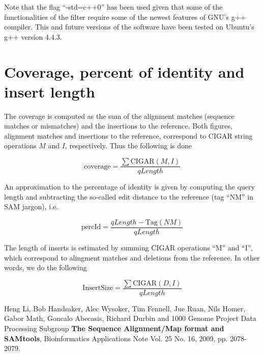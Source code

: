 \documentclass[11pt]{article}
\begin{document}
Note that the flag ``-std=c++0'' has been used given that some of the functionalities of the filter require 
some of the newest features of GNU's g++ compiler. This and future versions of the software have been tested 
on Ubuntu's g++ version 4.4.3.

\section{Coverage, percent of identity and insert length}
The coverage is computed as the sum of the alignment matches (sequence matches or mismatches) and 
the insertions to the reference. Both figures, alignment matches and insertions to the reference, correspond 
to CIGAR string operations $M$ and $I$, respectively. Thus the following is done 

\begin{equation}
	\mathrm{coverage} = \frac{\sum\mathrm{CIGAR}\left(M,I\right)}{qLength}
\end{equation}

An approximation to the percentage of identity is given by computing the query length and subtracting the 
so-called edit distance to the reference (tag ``NM'' in SAM jargon), i.e.

\begin{equation}
	\mathrm{percId} = \frac{qLength - \mathrm{Tag}(NM)}{qLength}
\end{equation}

The length of inserts is estimated by summing CIGAR operations ``M'' and ``I'', which correspond to alingment 
matches and deletions from the reference. In other words, we do the following

\begin{equation}
	\mathrm{InsertSize} = \frac{\sum\mathrm{CIGAR}\left(D,I\right)}{qLength}
\end{equation}


\begin{thebibliography}{99}
 Heng Li, Bob Handsaker, Alec Wysoker, Tim Fennell, Jue Ruan, Nils Homer, Gabor Math, 
Goncalo Abecasis, Richard Durbin and 1000 Genome Project Data Processing Subgroup 
{\bf The Sequence Alignment/Map format and SAMtools}, 
Bioinformatics Applications Note Vol. 25 No. 16, 2009, pp. 2078-2079.
\end{thebibliography}


\end{document}
